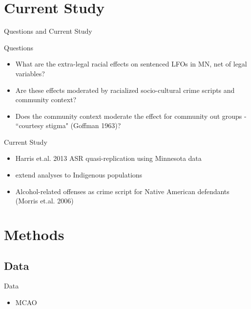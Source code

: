 \documentclass{beamer}
\begin{document}
\section{Current Study}

\begin{frame}{Questions and Current Study}

\begin{block}{Questions}
\begin{itemize}
\item What are the extra-legal racial effects on sentenced LFOs in MN, net of legal variables? 
\item Are these effects moderated by racialized socio-cultural crime scripts and community context?
\item Does the community context moderate the effect for community out groups - ``courtesy stigma" (Goffman 1963)?
\end{itemize}
\end{block}

\begin{block}{Current Study}
\begin{itemize}
\item Harris et.al. 2013 ASR quasi-replication using Minnesota data
\item extend analyses to Indigenous populations
\item Alcohol-related offenses as crime script for Native American defendants (Morris et.al. 2006)
\end{itemize}
\end{block} 
\end{frame}

\section{Methods}
\subsection{Data}

\begin{frame}{Data}
\begin{block}{}
\begin{itemize}

\item MCAO

\end{itemize}
\end{block}
\end{frame}
\end{document}
